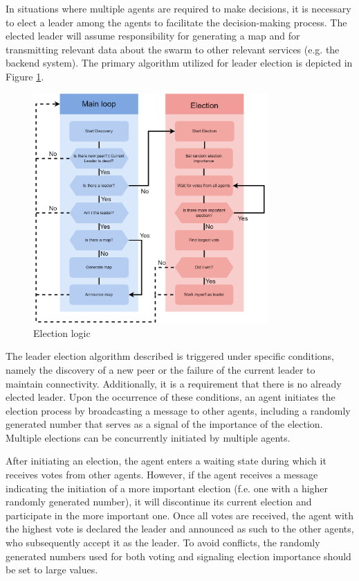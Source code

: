 In situations where multiple agents are required to make decisions, it is necessary to elect a leader among the agents to facilitate the decision-making process. The elected leader will assume responsibility for generating a map and for transmitting relevant data about the swarm to other relevant services (e.g. the backend system). The primary algorithm utilized for leader election is depicted in Figure \ref{fig:election_logic}. 

\begin{figure}[H]
    \centering
    \includegraphics[width=0.8\textwidth]{pictures/election_logic.png}
    \caption{Election logic}
    \label{fig:election_logic}
\end{figure}

The leader election algorithm described is triggered under specific conditions, namely the discovery of a new peer or the failure of the current leader to maintain connectivity. Additionally, it is a requirement that there is no already elected leader. Upon the occurrence of these conditions, an agent initiates the election process by broadcasting a message to other agents, including a randomly generated number that serves as a signal of the importance of the election. Multiple elections can be concurrently initiated by multiple agents.

After initiating an election, the agent enters a waiting state during which it receives votes from other agents. However, if the agent receives a message indicating the initiation of a more important election (f.e. one with a higher randomly generated number), it will discontinue its current election and participate in the more important one. Once all votes are received, the agent with the highest vote is declared the leader and announced as such to the other agents, who subsequently accept it as the leader. To avoid conflicts, the randomly generated numbers used for both voting and signaling election importance should be set to large values.